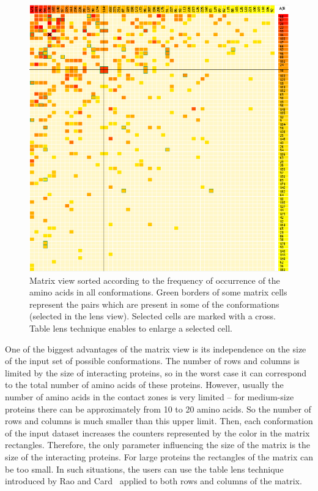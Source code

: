 \documentclass[journal]{vgtc}                %
\begin{document}
\begin{figure}[bt]
  \centering
  \includegraphics[width=0.8\columnwidth]{sort.png}
  \caption{Matrix view sorted according to the frequency of occurrence of the amino acids in all conformations. Green borders of some matrix cells represent the pairs which are present in some of the conformations (selected in the lens view). Selected cells are marked with a cross. Table lens technique enables to enlarge a selected cell.}
  \label{fig:sort}
\end{figure}

One of the biggest advantages of the matrix view is its independence on the size of the input set of possible conformations.
The number of rows and columns is limited by the size of interacting proteins, so in the worst case it can correspond to the total number of amino acids of these proteins.
However, usually the number of amino acids in the contact zones is very limited -- for medium-size proteins there can be approximately from 10 to 20 amino acids.
So the number of rows and columns is much smaller than this upper limit.
Then, each conformation of the input dataset increases the counters represented by the color in the matrix rectangles.
Therefore, the only parameter influencing the size of the matrix is the size of the interacting proteins.
For large proteins the rectangles of the matrix can be too small.
In such situations, the users can use the table lens technique introduced by Rao and Card~\cite{Rao1994} applied to both rows and columns of the matrix.
\end{document}
